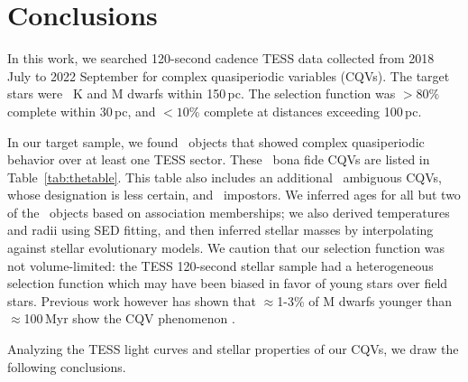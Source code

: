 \documentclass[11pt,twocolumn,tighten]{aastex63}
\begin{document}
\section{Conclusions}
\label{sec:conclusion}

In this work, we searched 120-second cadence TESS data collected from
2018 July to 2022 September for complex quasiperiodic variables
(CQVs).  The target stars were \nstarssearched\ K and M dwarfs within
150\,pc.  The selection function was $>$$80\%$ complete within 30\,pc,
and $<$$10\%$ complete at distances exceeding 100\,pc.

In our target sample, we found \ngoods\ objects that showed complex
quasiperiodic behavior over at least one TESS sector.  These \ngoods\
bona fide CQVs are listed in Table~\ref{tab:thetable}.  This table also
includes an additional \nmaybes\ ambiguous CQVs, whose designation is
less certain, and \ndebunked\ impostors.  We inferred ages for all but
two of the \nallcands\ objects based on association memberships; we
also derived temperatures and radii using SED fitting, and then
inferred stellar masses by interpolating against stellar evolutionary
models.  We caution that our selection function was not
volume-limited: the TESS 120-second stellar sample had a heterogeneous
selection function which may have been biased in favor of young stars
over field stars.  Previous work however has shown that $\approx$1-3\%
of M dwarfs younger than $\approx$100\,Myr show the CQV phenomenon
\citep{2016AJ....152..114R,2022AJ....163..144G}.

Analyzing the TESS light curves and stellar properties of our CQVs, we
draw the following conclusions.
\end{document}
